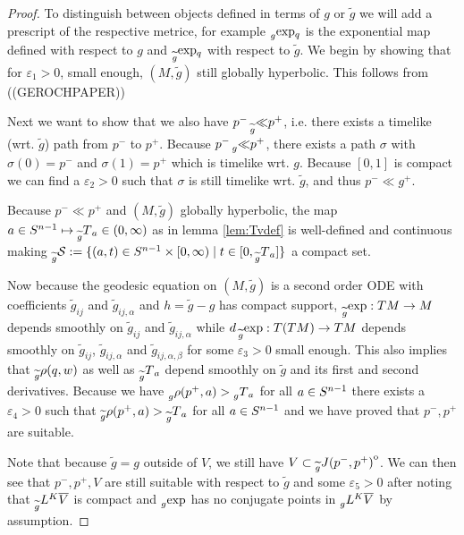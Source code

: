 \begin{proof}
    To distinguish between objects defined in terms of $g$ or $\widetilde{g}$ we will add a prescript of the respective metrice, for example $\prescript{}{g}{\exp}_q$ is the exponential map defined with respect to $g$ and $\prescript{}{\widetilde{g}}{\exp}_q$ with respect to $\widetilde{g}$. We begin by showing that for $\varepsilon_1>0$, small enough, $(M,\widetilde{g})$ still globally hyperbolic. This follows from ((GEROCHPAPER))
    
    Next we want to show that we also have $p^- \prescript{}{\widetilde{g}}{\ll} p^+$, i.e. there exists a timelike (wrt. $\widetilde{g}$) path from 
    $p^-$ to $p^+$. Because $p^- \prescript{}{g}{\ll} p^+$, there exists a path $\sigma$ with $\sigma(0)=p^-$ and $\sigma(1)=p^+$ which is timelike wrt. $g$. Because $[0,1]$ is compact we can find a $\varepsilon_2>0$ such that $\sigma$ is still timelike wrt. $\widetilde{g}$, and thus $p^-\ll g^+$.

    Because $p^-\ll p^+$ and $(M,\widetilde{g})$ globally hyperbolic, the map $a\in {S^{n-1}} \mapsto \prescript{}{\widetilde{g}}{T}_a\in (0,\infty)$ as in lemma \ref{lem:Tvdef} is well-defined and continuous making $\prescript{}{\widetilde{g}}{{\mathcal{S}}} := \{(a,t)\in {S^{n-1}}\times [0,\infty) \mid t\in [0,\prescript{}{\widetilde{g}}{T}_a]\}$ a compact set. 

    Now because the geodesic equation on $(M,\widetilde{g})$ is a second order ODE with coefficients $\widetilde{g}_{ij}$ and $\widetilde{g}_{ij,\alpha}$ and $h=\widetilde{g}-g$ has compact support, $\prescript{}{\widetilde{g}}{\exp}:TM\to M$ depends smoothly on $\widetilde{g}_{ij}$ and $\widetilde{g}_{ij,\alpha}$ while $d\prescript{}{\widetilde{g}}{\exp}:T(TM)\to TM$ depends smoothly on $\widetilde{g}_{ij}$, $\widetilde{g}_{ij,\alpha}$ and $\widetilde{g}_{ij,\alpha,\beta}$ for some $\varepsilon_3>0$ small enough. This also implies that $\prescript{}{\widetilde{g}}{\rho(q,w)}$ as well as $\prescript{}{\widetilde{g}}{T}_a$ depend smoothly on $\widetilde{g}$ and its first and second derivatives. Because we have $\prescript{}{g}{\rho(p^+,a)}>\prescript{}{g}{T}_a$ for all $a\in {S^{n-1}}$ there exists a $\varepsilon_4>0$ such that $\prescript{}{\widetilde{g}}{\rho(p^+,a)}>\prescript{}{\widetilde{g}}{T}_a$ for all $a\in {S^{n-1}}$ and we have proved that $p^-,p^+$ are suitable.

    Note that because $\widetilde{g}=g$ outside of $V$, we still have $V\subset {\kern0pt\prescript{}{\widetilde{g}}{J(p^-,p^+)}}^{\mathrm{o}}$. We can then see that $p^-,p^+,V$ are still suitable with respect to $\widetilde{g}$ and some $\varepsilon_5>0$ after noting that $\prescript{}{\widetilde{g}}{L}^K{\overline{V}}$ is compact and $\prescript{}{g}{\exp}$ has no conjugate points in $\prescript{}{g}{L}^K{\overline{V}}$ by assumption.
\end{proof}

